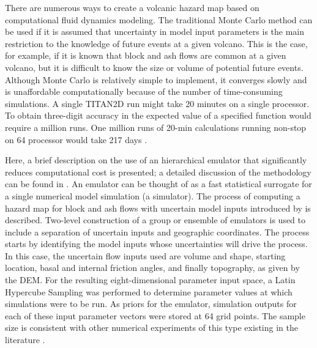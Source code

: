 \documentclass[12pt]{article}
\begin{document}
There are numerous ways to create a volcanic hazard map based on
computational fluid dynamics modeling.  The traditional Monte Carlo
method can be used if it is assumed that uncertainty in model input
parameters is the main restriction to the knowledge of future events
at a given volcano. This is the case, for example, if it is known that
block and ash flows are common at a given volcano, but it is difficult
to know the size or volume of potential future events.  Although Monte
Carlo is relatively simple to implement, it converges slowly and is
unaffordable computationally because of the number of time-consuming
simulations.  A single TITAN2D run might take 20 minutes on a single
processor. To obtain three-digit accuracy in the expected value of a
specified function would require a million runs. One million runs of
20-min calculations running non-stop on 64 processor would take 217
days \citep{Keith}.

Here, a brief description on the use of an hierarchical emulator that
significantly reduces computational cost is presented; a detailed discussion of the
methodology can be found in \citet{dalbeythesis, Keith}. An emulator
can be thought of as a fast statistical surrogate for a single numerical model
simulation (a simulator). The process of computing a
hazard map for block and ash flows with uncertain model inputs
introduced by \citet{dalbeythesis} is described.  Two-level construction of a group
or ensemble of emulators is used to include a separation of uncertain
inputs and geographic coordinates.  The process starts by identifying
the model inputs whose uncertainties will drive the process. In this
case, the uncertain flow inputs used are volume and shape, starting
location, basal and internal friction angles, and finally topography,
as given by the DEM.  For the resulting eight-dimensional parameter
input space, a Latin Hypercube Sampling was performed to determine
parameter values at which simulations were to be run. As priors for 
the emulator, simulation outputs
for each of these input parameter vectors were stored at 64 grid
points. The sample size is consistent with other numerical experiments
of this type existing in the literature \citep{McKay1979, Sacks1989, Mitasova1996}. 
\end{document}
